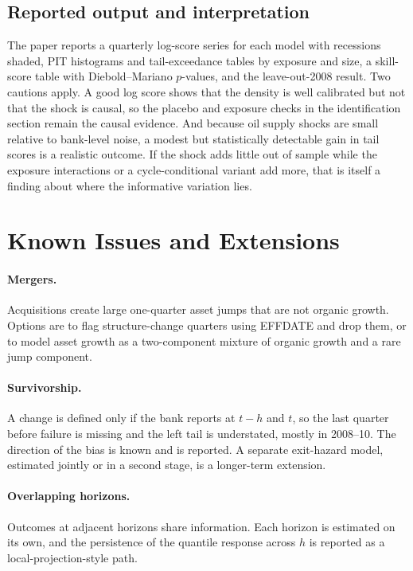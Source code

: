 \documentclass[11pt]{article}
\begin{document}
\subsection{Reported output and interpretation}

The paper reports a quarterly log-score series for each model with recessions shaded, PIT histograms and tail-exceedance tables by exposure and size, a skill-score table with Diebold--Mariano $p$-values, and the leave-out-2008 result. Two cautions apply. A good log score shows that the density is well calibrated but not that the shock is causal, so the placebo and exposure checks in the identification section remain the causal evidence. And because oil supply shocks are small relative to bank-level noise, a modest but statistically detectable gain in tail scores is a realistic outcome. If the shock adds little out of sample while the exposure interactions or a cycle-conditional variant add more, that is itself a finding about where the informative variation lies.

\section{Known Issues and Extensions}\label{sec:extensions}

\paragraph{Mergers.} Acquisitions create large one-quarter asset jumps that are not organic growth. Options are to flag structure-change quarters using EFFDATE and drop them, or to model asset growth as a two-component mixture of organic growth and a rare jump component.

\paragraph{Survivorship.} A change is defined only if the bank reports at $t-h$ and $t$, so the last quarter before failure is missing and the left tail is understated, mostly in 2008--10. The direction of the bias is known and is reported. A separate exit-hazard model, estimated jointly or in a second stage, is a longer-term extension.

\paragraph{Overlapping horizons.} Outcomes at adjacent horizons share information. Each horizon is estimated on its own, and the persistence of the quantile response across $h$ is reported as a local-projection-style path.
\end{document}
